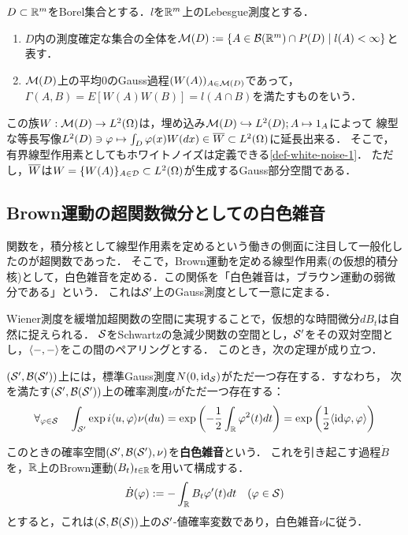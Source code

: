 \documentclass[uplatex,dvipdfmx]{jsreport}
\begin{document}
\begin{definition}
    $D\subset\R^m$をBorel集合とする．$l$を$\R^m$上のLebesgue測度とする．
    \begin{enumerate}
        \item $D$内の測度確定な集合の全体を$\M(D):=\Brace{A\in\B(\R^m)\cap P(D)\mid l(A)<\infty}$と表す．
        \item $\M(D)$上の平均$0$のGauss過程$(W(A))_{A\in\M(D)}$であって，$\Gamma(A,B)=E[W(A)W(B)]=l(A\cap B)$を満たすものをいう．
    \end{enumerate}
\end{definition}
\begin{remarks}
    この族$W:\M(D)\to L^2(\Om)$は，埋め込み$\M(D)\mono L^2(D);A\mapsto 1_A$によって
    線型な等長写像$L^2(D)\ni\varphi\mapsto\int_D\varphi(x)W(dx)\in\o{W}\subset L^2(\Om)$に延長出来る．
    そこで，有界線型作用素としてもホワイトノイズは定義できる\ref{def-white-noise-1}．
    ただし，$\o{W}$は$W=\{W(A)\}_{A\in\D}\subset L^2(\Om)$が生成するGauss部分空間である．
\end{remarks}

\subsection{Brown運動の超関数微分としての白色雑音}

\begin{tcolorbox}[colframe=ForestGreen, colback=ForestGreen!10!white,breakable,colbacktitle=ForestGreen!40!white,coltitle=black,fonttitle=\bfseries\sffamily,
title=]
    関数を，積分核として線型作用素を定めるという働きの側面に注目して一般化したのが超関数であった．
    そこで，Brown運動を定める線型作用素(の仮想的積分核)として，白色雑音を定める．この関係を「白色雑音は，ブラウン運動の弱微分である」という．
    これは$\S'$上のGauss測度として一意に定まる．
\end{tcolorbox}

\begin{discussion}
    Wiener測度を緩増加超関数の空間に実現することで，仮想的な時間微分$dB_t$は自然に捉えられる．
    $\S$をSchwartzの急減少関数の空間とし，$\S'$をその双対空間とし，$\brac{-,-}$をこの間のペアリングとする．
    このとき，次の定理が成り立つ．
    \begin{theorem}[白色雑音の存在定理]\label{thm-existence-of-white-noise}
        $(\S',\B(\S'))$上には，標準Gauss測度$N(0,\id_{\S})$がただ一つ存在する．すなわち，
        次を満たす$(\S',\B(\S'))$上の確率測度$\nu$がただ一つ存在する：
        \[\forall_{\varphi\in\S}\quad\int_{\S'}\exp{i\brac{u,\varphi}}\nu(du)=\exp\paren{-\frac{1}{2}\int_\R\varphi^2(t)dt}=\exp\paren{\frac{1}{2}\brac{\id\varphi,\varphi}}\]
    \end{theorem}
    このときの確率空間$(\S',\B(\S'),\nu)$を\textbf{白色雑音}という．
    これを引き起こす過程$\dot{B}$を，$\R$上のBrown運動$(B_t)_{t\in\R}$を用いて構成する．
    \[\dot{B}(\varphi):=-\int_\R B_t\varphi'(t)dt\quad(\varphi\in\S)\]
    とすると，これは$(\S,\B(\S))$上の$\S'$-値確率変数であり，白色雑音$\nu$に従う．
\end{discussion}
\end{document}
